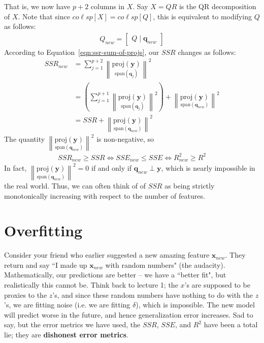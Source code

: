 \documentclass[12pt, a4paper]{article}
\theoremstyle{definition}
\begin{document}
	That is, we now have $p+2$ columns in $X$.
	Say $X=QR$ is the QR decomposition of $X$. Note that since $co \ell sp[X]=co \ell sp[Q]$,
	this is equivalent to modifying $Q$ as follows:
	\begin{align*}
		Q_{new} = \begin{bmatrix}
			Q \mid \mathbf{q}_{new}
		\end{bmatrix}
	\end{align*}
	According to Equation~\ref{eqn:ssr-sum-of-projs}, our $SSR$ changes as follows:
	\begin{align*}
		SSR_{new} &= \sum_{j=1}^{p+2}\left\|
		\underset{\text{span}(\mathbf{q}_j)}{\text{proj}(\mathbf{y})}
		\right\|^2\\
		&=\left(\sum_{j=1}^{p+1}\left\|
		\underset{\text{span}(\mathbf{q}_j)}{\text{proj}(\mathbf{y})}
		\right\|^2\right)
		+\left\|
		\underset{\text{span}(\mathbf{q}_{new})}{\text{proj}(\mathbf{y})}
		\right\|^2\\
		&=SSR + \left\|
		\underset{\text{span}(\mathbf{q}_{new})}{\text{proj}(\mathbf{y})}
		\right\|^2
	\end{align*}
	The quantity $\left\|
	\underset{\text{span}(\mathbf{q}_{new})}{\text{proj}(\mathbf{y})}
	\right\|^2$ is non-negative, so
	\begin{align*}
	SSR_{new}\geq SSR\iff SSE_{new}\leq SSE\iff R^2_{new}\geq R^2
	\end{align*}
	In fact, $\left\|
	\underset{\text{span}(\mathbf{q}_{new})}{\text{proj}(\mathbf{y})}
	\right\|^2=0$ if and only if $\mathbf{q}_{new}\perp \mathbf{y}$, which
	is nearly impossible in the real world. Thus, we can often think of
	of $SSR$ as being strictly monotonically increasing with respect to
	the number of features.
	\section*{Overfitting}
	Consider your friend who earlier suggested a new amazing feature $\mathbf{x}_{new}$.
	They return and say ``I made up $\mathbf{x}_{new}$ with random numbers" (the audacity).
	Mathematically, our predictions are better -- we have a ``better fit", but realistically
	this cannot be. Think back to lecture 1; the $x$'s are supposed to be proxies to the $z$'s,
	and since these random numbers have nothing to do with the $z$'s, we are fitting
	noise (i.e. we are fitting $\delta$), which is impossible. The new model will
	predict worse in the future, and hence generalization error increases.
	Sad to say, but the error metrics we have used, the $SSR$, $SSE$, and $R^2$
	have been a total lie; they are \textbf{dishonest error metrics}.
	
\end{document}
